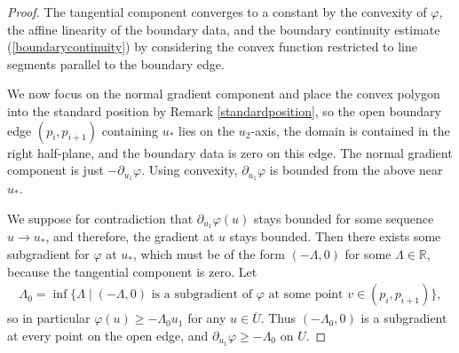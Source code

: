 \documentclass[11pt]{article}
\begin{document}
\begin{proof}\label{blowupproof}
The tangential component converges to a constant by the convexity of $\varphi$, the affine linearity of the boundary data, and the boundary continuity estimate (\ref{boundarycontinuity}) by considering the convex function restricted to line segments parallel to the boundary edge. 

We now focus on the normal gradient component and place the convex polygon into the standard position by Remark \ref{standardposition}, so the open boundary edge $(p_i, p_{i+1})$ containing $u_*$ lies on the $u_2$-axis, the domain is contained in the right half-plane, and the boundary data is zero on this edge. The normal gradient component is just $-\partial_{u_1}\varphi$. Using convexity, $\partial_{u_1}\varphi$ is bounded from the above near $u_*$.  








We suppose for contradiction that $\partial_{u_1} \varphi (u)$ stays bounded for some sequence $u \to u_*$, and therefore, the gradient at $u$ stays bounded. Then there exists some subgradient for $\varphi$ at $u_*$, which must be of the form $(-\Lambda, 0)$ for some $\Lambda\in \mathbb{R}$, because the tangential component is zero. 
Let 
\begin{align*}
    \Lambda_0 = \inf \{ \Lambda \; | \; (-\Lambda,0) \text{ is a subgradient of } \varphi \text{ at some point } v \in (p_i,p_{i+1})  \},
\end{align*}
so in particular $\varphi(u)\geq -\Lambda_0 u_1$ for any $u\in \overline{U}$. Thus $(-\Lambda_0, 0)$ is a subgradient at every point on the open edge, and $\partial_{u_1} \varphi\geq -\Lambda_0$ on $U$.





\end{proof}
\end{document}
